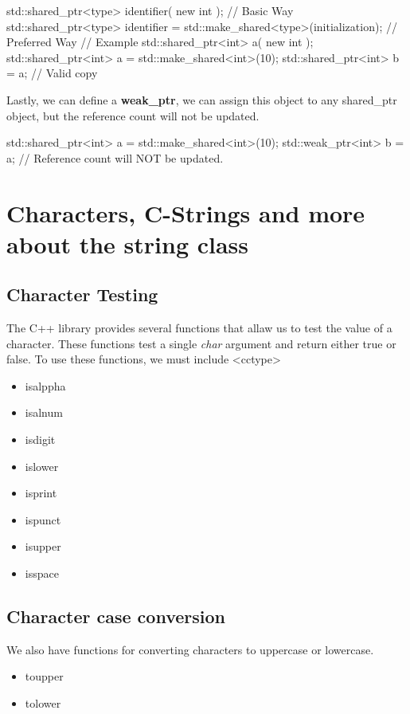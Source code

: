 \documentclass{report}
\begin{document}
    \begin{cppcode}
std::shared_ptr<type> identifier( new int ); // Basic Way
std::shared_ptr<type> identifier = std::make_shared<type>(initialization); // Preferred Way
// Example
std::shared_ptr<int> a( new int );
std::shared_ptr<int> a = std::make_shared<int>(10);
std::shared_ptr<int> b = a; // Valid copy
    \end{cppcode}
    

    \bigbreak \noindent 
    Lastly, we can define a \textbf{weak\_ptr}, we can assign this object to any shared\_ptr object, but the reference count will not be updated.
    \bigbreak \noindent 
    
    \begin{cppcode}
std::shared_ptr<int> a = std::make_shared<int>(10);
std::weak_ptr<int> b = a; // Reference count will NOT be updated.
    \end{cppcode}
    

    \pagebreak \bigbreak \noindent 
    \section{\LARGE Characters, C-Strings and more about the string class}
    \bigbreak \noindent 
    \subsection{Character Testing}
    \bigbreak \noindent 
    The C++ library provides several functions that allaw us to test the value of a character. These functions test a single \textit{char} argument and return either true or false.
    \bigbreak \noindent 
    To use these functions, we must include <cctype>
    \begin{itemize}
        \item isalppha
        \item isalnum
        \item isdigit
        \item islower
        \item isprint
        \item ispunct
        \item isupper
        \item isspace
    \end{itemize}

    \bigbreak \noindent 
    \subsection{Character case conversion}
    \bigbreak \noindent 
    We also have functions for converting characters to uppercase or lowercase.
    \begin{itemize}
        \item toupper
        \item tolower
    \end{itemize}
\end{document}
